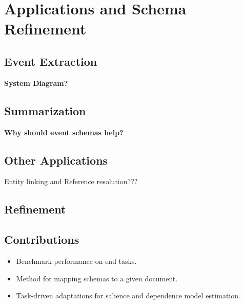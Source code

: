 \section{Applications and Schema Refinement}

\subsection{Event Extraction}
\textbf{System Diagram?}

\subsection{Summarization}

\textbf{Why should event schemas help?}

\subsection{Other Applications}

Entity linking and Reference resolution???


\subsection{Refinement}


\subsection{Contributions}

\begin{itemize}
\item Benchmark performance on end tasks.
\item Method for mapping schemas to a given document.
\item Task-driven adaptations for salience and dependence model estimation.
\end{itemize}
